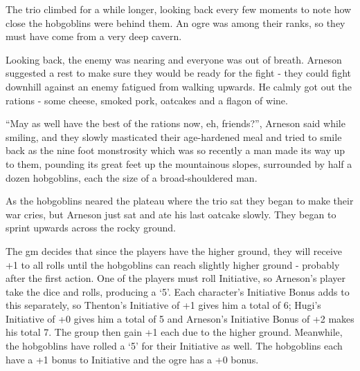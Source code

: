 \begin{multicols}{2}
{\begin{exampletext}
	The trio climbed for a while longer, looking back every few moments to note how close the hobgoblins were behind them. An ogre was among their ranks, so they must have come from a very deep cavern.

	Looking back, the enemy was nearing and everyone was out of breath.
	Arneson suggested a rest to make sure they would be ready for the fight - they could fight downhill against an enemy fatigued from walking upwards.
	He calmly got out the rations - some cheese, smoked pork, oatcakes and a flagon of wine.

	``May as well have the best of the rations now, eh, friends?'', Arneson said while smiling, and they slowly masticated their age-hardened meal and tried to smile back as the nine foot monstrosity which was so recently a man made its way up to them, pounding its great feet up the mountainous slopes, surrounded by half a dozen hobgoblins, each the size of a broad-shouldered man.

	As the hobgoblins neared the plateau where the trio sat they began to make their war cries, but Arneson just sat and ate his last oatcake slowly. They began to sprint upwards across the rocky ground.

	The \gls{gm} decides that since the players have the higher ground, they will receive +1 to all rolls until the hobgoblins can reach slightly higher ground - probably after the first action.
One of the players must roll Initiative, so Arneson's player take the dice and rolls, producing a `5'.
Each character's Initiative Bonus adds to this separately, so Thenton's Initiative of +1 gives him a total of 6; Hugi's Initiative of +0 gives him a total of 5 and Arneson's Initiative Bonus of +2 makes his total 7.
The group then gain +1 each due to the higher ground.
Meanwhile, the hobgoblins have rolled a `5' for their Initiative as well.
The hobgoblins each have a +1 bonus to Initiative and the ogre has a +0 bonus.


\end{exampletext}}
\end{multicols}
